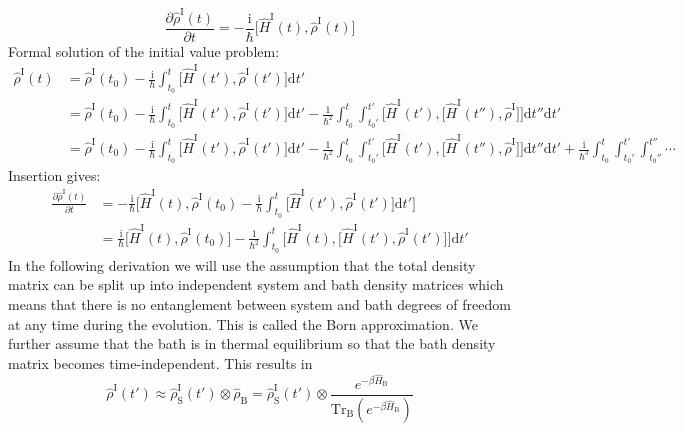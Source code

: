\documentclass[9pt]{report}
\begin{document}
\begin{equation}
\frac{\partial\hat{\rho}^{\mathrm{I}}(t)}{\partial t} = -\frac{\mathrm{i}}{\hbar}\big[\hat{H}^{\mathrm{I}}(t),\hat{\rho}^{\mathrm{I}}(t)\big]
\end{equation}
Formal solution of the initial value problem:
\begin{align}
\hat{\rho}^{\mathrm{I}}(t) &= \hat{\rho}^{\mathrm{I}}(t_0)-\frac{\mathrm{i}}{\hbar}\int_{t_0}^{t}\big[\hat{H}^{\mathrm{I}}(t'),\hat{\rho}^{\mathrm{I}}(t')\big]\mathrm{d}t'\\
&= \hat{\rho}^{\mathrm{I}}(t_0)-\frac{\mathrm{i}}{\hbar}\int_{t_0}^{t}\big[\hat{H}^{\mathrm{I}}(t'),\hat{\rho}^{\mathrm{I}}(t')\big]\mathrm{d}t'-\frac{1}{\hbar^2}\int_{t_0}^{t}\int_{t_0'}^{t'}\big[\hat{H}^{\mathrm{I}}(t'),\big[\hat{H}^{\mathrm{I}}(t''),\hat{\rho}^{\mathrm{I}}\big]\big]\mathrm{d}t''\mathrm{d}t'\\
&= \hat{\rho}^{\mathrm{I}}(t_0)-\frac{\mathrm{i}}{\hbar}\int_{t_0}^{t}\big[\hat{H}^{\mathrm{I}}(t'),\hat{\rho}^{\mathrm{I}}(t')\big]\mathrm{d}t'-\frac{1}{\hbar^2}\int_{t_0}^{t}\int_{t_0'}^{t'}\big[\hat{H}^{\mathrm{I}}(t'),\big[\hat{H}^{\mathrm{I}}(t''),\hat{\rho}^{\mathrm{I}}\big]\big]\mathrm{d}t''\mathrm{d}t'+\frac{\mathrm{i}}{\hbar^3}\int_{t_0}^{t}\int_{t_0'}^{t'}\int_{t_0''}^{t''}\cdots
\end{align}
Insertion gives:
\begin{align}
\frac{\partial\hat{\rho}^{\mathrm{I}}(t)}{\partial t} &= -\frac{\mathrm{i}}{\hbar}\big[\hat{H}^{\mathrm{I}}(t),\hat{\rho}^{\mathrm{I}}(t_0)-\frac{\mathrm{i}}{\hbar}\int_{t_0}^{t}\big[\hat{H}^{\mathrm{I}}(t'),\hat{\rho}^{\mathrm{I}}(t')\big]\mathrm{d}t'\big]\\
&= \frac{\mathrm{i}}{\hbar}\big[\hat{H}^{\mathrm{I}}(t),\hat{\rho}^{\mathrm{I}}(t_0)\big]-\frac{1}{\hbar^2}\int_{t_0}^{t}\big[\hat{H}^{\mathrm{I}}(t),\big[\hat{H}^{\mathrm{I}}(t'),\hat{\rho}^{\mathrm{I}}(t')\big]\big]\mathrm{d}t'
\end{align}
In the following derivation we will use the assumption that the total density matrix can be split up into independent system and bath density matrices which means that there is no entanglement between system and bath degrees of freedom at any time during the evolution. This is called the Born approximation. We further assume that the bath is in thermal equilibrium so that the bath density matrix becomes time-independent. This results in
\begin{equation}
\hat{\rho}^{\mathrm{I}}(t')\approx \hat{\rho}_{\mathrm{S}}^{\mathrm{I}}(t')\otimes\hat{\rho}_{\mathrm{B}}=\hat{\rho}_{\mathrm{S}}^{\mathrm{I}}(t')\otimes\frac{e^{-\beta\hat{H}_{\mathrm{B}}}}{\mathrm{Tr}_{\mathrm{B}}(e^{-\beta\hat{H}_{\mathrm{B}}})}
\end{equation}
\end{document}
